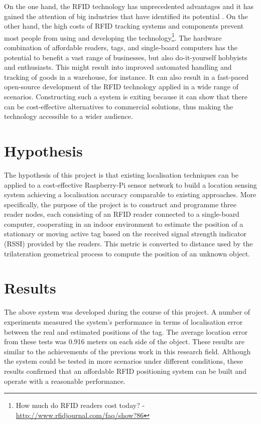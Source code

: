 On the one hand, the RFID technology has unprecedented advantages and it has gained the attention of big industries that have identified its potential \cite[p. 39]{Hunt2007}. On the other hand, the high costs of RFID tracking systems and components prevent most people from using and developing the technology\footnote{How much do RFID readers cost today? - \url{http://www.rfidjournal.com/faq/show?86}}. The hardware combination of affordable readers, tags, and single-board computers has the potential to benefit a vast range of businesses, but also do-it-yourself hobbyists and enthusiasts. This might result into improved automated handling and tracking of goods in a warehouse, for instance. It can also result in a fast-paced open-source development of the RFID technology applied in a wide range of scenarios. Constructing such a system is exiting because it can show that there can be cost-effective alternatives to commercial solutions, thus making the technology accessible to a wider audience.

\section{Hypothesis}

The hypothesis of this project is that existing localisation techniques can be applied to a cost-effective Raspberry-Pi sensor network to build a location sensing system achieving a localisation accuracy comparable to existing approaches. More specifically, the purpose of the project is to construct and programme three reader nodes, each consisting of an RFID reader connected to a single-board computer, cooperating in an indoor environment to estimate the position of a stationary or moving active tag based on the received signal strength indicator (RSSI) provided by the readers. This metric is converted to distance used by the trilateration geometrical process to compute the position of an unknown object.

\section{Results}

The above system was developed during the course of this project. A number of experiments measured the system's performance in terms of localisation error between the real and estimated positions of the tag. The average location error from these tests was 0.916 meters on each side of the object. These results are similar to the achievements of the previous work in this research field. Although the system could be tested in more scenarios under different conditions, these results confirmed that an affordable RFID positioning system can be built and operate with a reasonable performance.

